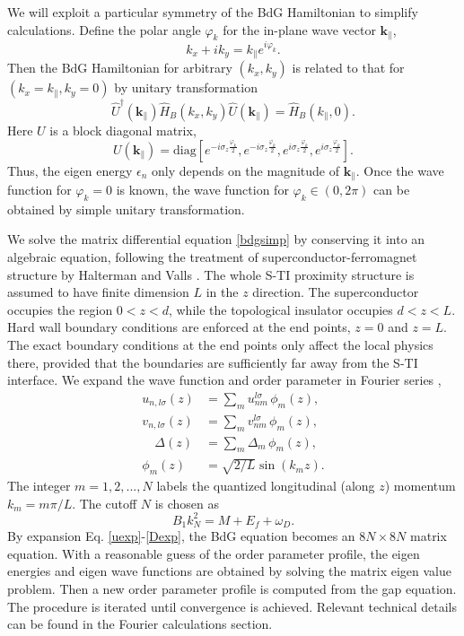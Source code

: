 \documentclass[11pt,revtex,aps]{report}
\newcommand{\kperp}{\mathbf{k}_\parallel}
\begin{document}
We will exploit a particular symmetry of the BdG Hamiltonian to simplify 
calculations. Define the polar angle $\varphi_k$ for the in-plane wave vector $\kperp$, 
\begin{equation}
k_x+ik_y=k_{\parallel}e^{i\varphi_k}.
\end{equation}
Then the BdG Hamiltonian for arbitrary $(k_x,k_y)$ is
related to that for $(k_x=k_\parallel,k_y=0)$ by unitary transformation 
\begin{equation}
\hat{U}^\dagger(\kperp) \hat{H}_{B}(k_x,k_y) \hat{U}(\kperp) = \hat{H}_{B}(k_\parallel,0).
\label{symm}
\end{equation}
Here $U$ is a 
block diagonal matrix,
\begin{equation}
U(\kperp)=\mathrm{diag}[e^{-i\sigma_z\frac{\varphi_k}{2}}, e^{-i\sigma_z\frac{\varphi_k}{2}}, e^{i\sigma_z\frac{\varphi_k}{2}},e^{i\sigma_z\frac{\varphi_k}{2}} ]. \label{unit}
\end{equation}
Thus, the eigen energy $\epsilon_n$ only depends on the magnitude of $\kperp$.
Once the wave function for $\varphi_k=0$ is known, the wave function for $\varphi_k\in (0,2\pi)$
can be obtained by simple unitary transformation.

We solve the matrix differential equation \eqref{bdgsimp} by conserving it into an algebraic equation, 
following the treatment of superconductor-ferromagnet structure by 
Halterman and Valls \cite{h-v}. The whole S-TI proximity structure is assumed to have 
finite dimension $L$ in the $z$
direction. The superconductor occupies the region $0<z<d$,
while the topological insulator occupies $d<z<L$. Hard wall boundary conditions are enforced at the end points, 
$z=0$ and $z=L$.  
The exact boundary conditions at the end points only affect the local physics there, provided 
that the boundaries are sufficiently far away from the S-TI interface. We expand the wave function
and order parameter in Fourier series \cite{h-v},
\begin{align}
u_{n,l\sigma}(z) &= \sum_m u_{nm}^{l \sigma}\,\phi_m(z),\label{uexp}\\ 
v_{n,l\sigma}(z) &= \sum_m v_{nm}^{l \sigma}\, \phi_m(z),\\
\quad \Delta(z) &= \sum_m \Delta_{m}\, \phi_m(z) , \label{Dexp}\\
\phi_m(z)&=\sqrt{2/L}\sin(k_m z).
\end{align}
The integer $m=1,2,...,N$ labels the quantized longitudinal (along $z$) momentum $k_m=m\pi/L$. 
The cutoff $N$ is chosen as \cite{s-v}
\begin{equation}
B_1k^2_N=M+E_f+\omega_D. \label{eq-N}
\end{equation}
By expansion Eq. \eqref{uexp}-\eqref{Dexp}, the BdG equation
becomes an $8N \times 8N$ matrix equation. With a reasonable guess of the order parameter profile, 
the eigen energies and eigen wave functions are obtained by solving the matrix eigen value problem.
Then a new order parameter profile is computed from the gap equation. The procedure is iterated
until convergence is achieved.  Relevant technical details can be found
in the Fourier calculations section. 
\end{document}
